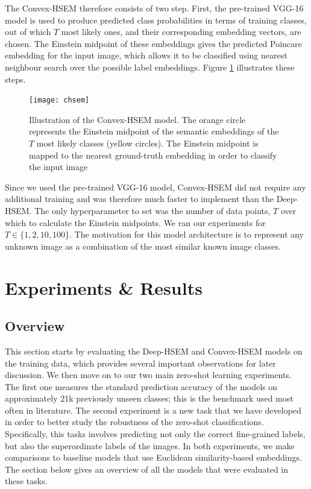 \documentclass[12pt]{report}
\begin{document}
The Convex-HSEM therefore consists of two step. First, the pre-trained VGG-16 model is used to produce predicted class probabilities in terms of training classes, out of which $T$ most likely ones, and their corresponding embedding vectors, are chosen. The Einstein midpoint of these embeddings gives the predicted Poincare embedding for the input image, which allows it to be classified using nearest neighbour search over the possible label embeddings. Figure \ref{fig:chsem} illustrates these steps. 
\begin{figure}
  \centering
  \texttt{[image: chsem]}
  \caption{Illustration of the Convex-HSEM model. The orange circle represents the Einstein midpoint of the semantic embeddings of the $T$ most likely classes (yellow circles). The Einstein midpoint is mapped to the nearest ground-truth embedding in order to classify the input image}
  \label{fig:chsem}
\end{figure}
Since we used the pre-trained VGG-16 model, Convex-HSEM did not require any additional training and was therefore much faster to implement than the Deep-HSEM. The only hyperparameter to set was the number of data points, $T$ over which to calculate the Einstein midpoints. We ran our experiments for 
$T \in \{1, 2, 10, 100\}$. The motivation for this model architecture is to represent any unknown image as a combination of the most similar known image classes. 
\newpage


\chapter{Experiments \& Results}
\section{Overview}
This section starts by evaluating the Deep-HSEM and Convex-HSEM models on the training data, which provides several important observations for later discussion. We then move on to our two main zero-shot learning experiments. The first one measures the standard prediction accuracy of the models on approximately 21k previously unseen classes; this is the benchmark used most often in literature. The second experiment is a new task that we have developed in order to better study the robustness of the zero-shot classifications. Specifically, this tasks involves predicting not only the correct fine-grained labels, but also the superordinate labels of the images. In both experiments, we make comparisons to baseline models that use Euclidean similarity-based embeddings. The section below gives an overview of all the models that were evaluated in these tasks.
\end{document}

